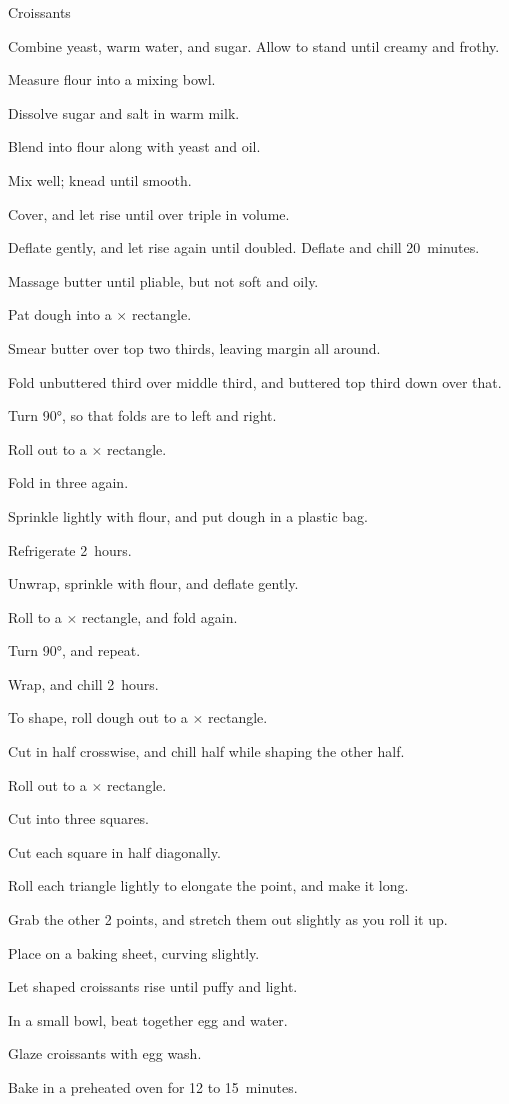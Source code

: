 \begin{recipe}{Croissants\UNTESTED}{}{}
\begin{directions}
\item Combine yeast, warm water, and  sugar. Allow to stand until creamy and frothy.
\item Measure flour into a mixing bowl.
\item Dissolve  sugar and salt in warm milk.
\item Blend into flour along with yeast and oil.
\item Mix well; knead until smooth.
\item Cover, and let rise until over triple in volume.
\item Deflate gently, and let rise again until doubled. Deflate and chill 20~minutes.
\item Massage butter until pliable, but not soft and oily.
\item Pat dough into a $\times$ rectangle.
\item Smear butter over top two thirds, leaving \cm{\half} margin all around.
\item Fold unbuttered third over middle third, and buttered top third down over that.
\item Turn \ang{90}, so that folds are to left and right.
\item Roll out to a $\times$ rectangle.
\item Fold in three again.
\item Sprinkle lightly with flour, and put dough in a plastic bag.
\item Refrigerate 2~hours.
\item Unwrap, sprinkle with flour, and deflate gently.
\item Roll to a $\times$ rectangle, and fold again.
\item Turn \ang{90}, and repeat.
\item Wrap, and chill 2~hours.
\item To shape, roll dough out to a $\times$ rectangle.
\item Cut in half crosswise, and chill half while shaping the other half.
\item Roll out to a $\times$ rectangle.
\item Cut into three  squares.
\item Cut each square in half diagonally.
\item Roll each triangle lightly to elongate the point, and make it  long.
\item Grab the other 2 points, and stretch them out slightly as you roll it up.
\item Place on a baking sheet, curving slightly.
\item Let shaped croissants rise until puffy and light.
\item In a small bowl, beat together egg and  water.
\item Glaze croissants with egg wash.
\item Bake in a preheated  oven for 12 to 15~minutes.
\end{directions}
\end{recipe}
